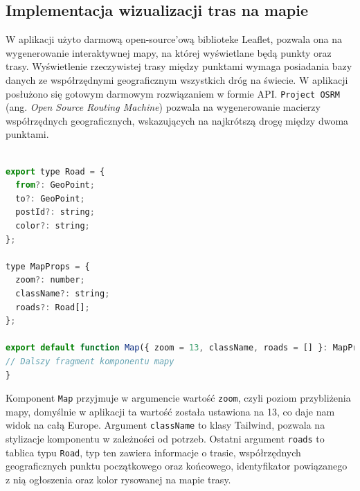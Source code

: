 \subsection{Implementacja wizualizacji tras na mapie}
W aplikacji użyto darmową open-source'ową biblioteke Leaflet, pozwala ona na wygenerowanie interaktywnej mapy, na której wyświetlane będą punkty oraz trasy. Wyświetlenie rzeczywistej trasy między punktami wymaga posiadania bazy danych ze współrzędnymi geograficznym wszystkich dróg na świecie. W aplikacji posłużono się gotowym darmowym rozwiązaniem w formie API. \texttt{Project OSRM} (ang. \emph{Open Source Routing Machine}) pozwala na wygenerowanie macierzy współrzędnych geograficznych, wskazujących na najkrótszą drogę między dwoma punktami.

{\belowcaptionskip=-9pt
\begin{lstlisting}[language=JavaScript,caption=Argumenty komponentu mapy, label=lst:mapProps]

export type Road = {
  from?: GeoPoint;
  to?: GeoPoint;
  postId?: string;
  color?: string;
};

type MapProps = {
  zoom?: number;
  className?: string;
  roads?: Road[];
};

export default function Map({ zoom = 13, className, roads = [] }: MapProps) {
// Dalszy fragment komponentu mapy
}
\end{lstlisting}
}

Komponent \texttt{Map} przyjmuje w argumencie wartość \texttt{zoom}, czyli poziom przybliżenia mapy, domyślnie w aplikacji ta wartość została ustawiona na 13, co daje nam widok na całą Europe. Argument \texttt{className} to klasy Tailwind, pozwala na stylizacje komponentu w zależności od potrzeb. Ostatni argument \texttt{roads} to tablica typu \texttt{Road}, typ ten zawiera informacje o trasie, współrzędnych geograficznych punktu początkowego oraz końcowego, identyfikator powiązanego z nią ogłoszenia oraz kolor rysowanej na mapie trasy.

